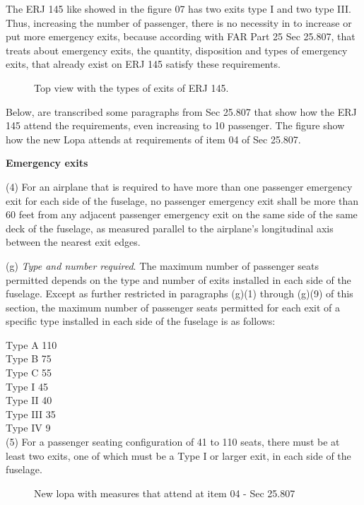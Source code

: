 The ERJ 145 like showed in the figure 07 has two exits type I and two type III. Thus, increasing the number of passenger, there is no necessity in to increase or put more emergency exits, because according with FAR Part 25 Sec 25.807, that treats about emergency exits, the quantity, disposition and types of emergency exits, that already exist on ERJ 145 satisfy these requirements.

\begin{figure}[H]
\caption{Top view with the types of exits of ERJ 145.}
\label{fig:145-exits}
\end{figure}


Below, are transcribed some paragraphs from Sec 25.807 that show how the ERJ 145 attend the requirements, even increasing to 10 passenger. The figure  show how the new Lopa attends at requirements of item 04 of Sec 25.807.

\textbf{Emergency exits}

(4) For an airplane that is required to have more than one passenger emergency exit for each side of the fuselage, no passenger emergency exit shall be more than 60 feet from any adjacent passenger emergency exit on the same side of the same deck of the fuselage, as measured parallel to the airplane's longitudinal axis between the nearest exit edges.


(g) \emph{Type and number required}. The maximum number of passenger seats permitted depends on the type and number of exits installed in each side of the fuselage. Except as further restricted in paragraphs (g)(1) through (g)(9) of this section, the maximum number of passenger seats permitted for each exit of a specific type installed in each side of the fuselage is as follows:

Type A 110\\
Type B 75\\
Type C 55\\
Type I 45\\
Type II 40\\
Type III 35\\
Type IV 9\\

(5) For a passenger seating configuration of 41 to 110 seats, there must be at least two exits, one of which must be a Type I or larger exit, in each side of the fuselage.


\begin{figure}[H]
\caption{New lopa with measures that attend at item 04 - Sec 25.807}
\label{fig:lopameasuresevacuation}
\end{figure}


